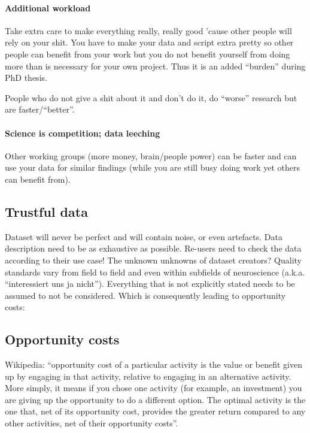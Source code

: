 \paragraph{Additional workload}
%
Take extra care to make everything really, really good 'cause other people will
rely on your shit.
%
You have to make your data and script extra pretty so other people can benefit
from your work but you do not benefit yourself from doing more than is necessary
for your own project.
%
Thus it is an added ``burden'' during PhD thesis.

%
People who do not give a shit about it and don't do it, do ``worse'' research
but are faster/``better''.


\paragraph{Science is competition; data leeching}
%
Other working groups (more money, brain/people power) can be faster and can use
your data for similar findings (while you are still busy doing work yet others
can benefit from).


\subsection{Trustful data}


%
Dataset will never be perfect and will contain noise, or even artefacts.
%
Data description need to be as exhaustive as possible.
%
Re-users need to check the data according to their use case!
%
The unknown unknowns of dataset creators?
%
Quality standards vary from field to field and even within subfields of
neuroscience (a.k.a. ``interessiert uns ja nicht'').
%
Everything that is not explicitly stated needs to be assumed to not be
considered.
%
Which is consequently leading to opportunity costs:


\subsection{Opportunity costs}

Wikipedia: ``opportunity cost of a particular activity is the value or benefit
given up by engaging in that activity, relative to engaging in an alternative
activity.
%
More simply, it means if you chose one activity (for example, an investment) you
are giving up the opportunity to do a different option.
%
The optimal activity is the one that, net of its opportunity cost, provides the
greater return compared to any other activities, net of their opportunity
costs''.

